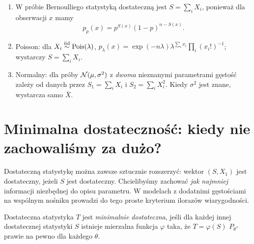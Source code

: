 \begin{przyklad}
\begin{enumerate}
\item W próbie Bernoulliego statystyką dostateczną jest
$S=\sum_iX_i$, ponieważ dla obserwacji $x$ mamy
\[
p_p(x)=p^{S(x)}(1-p)^{n-S(x)}.
\]
\item Poisson: dla $X_i\mathrel{\overset{\mathrm{iid}}\sim}\operatorname{Pois}(\lambda)$,
$p_\lambda(x)=\exp(-n\lambda)\lambda^{\sum_i x_i}
\prod_i(x_i!)^{-1}$; wystarczy $S=\sum_iX_i$.
\item Normalny: dla próby $\mathcal N(\mu,\sigma^2)$ z \emph{dwoma}
nieznanymi parametrami gęstość zależy od danych przez
$S_1=\sum_iX_i$ i $S_2=\sum_iX_i^2$.
Kiedy $\sigma^2$ jest znane, wystarcza samo $\bar X$.
\end{enumerate}
\end{przyklad}

\section{Minimalna dostateczność: kiedy nie zachowaliśmy za dużo?}
Dostateczną statystykę można zawsze sztucznie rozszerzyć:
wektor $(S,X_1)$ jest dostateczny, jeżeli $S$ jest dostateczny.
Chcielibyśmy zachować \emph{jak najmniej} informacji niezbędnej
do opisu parametru. W modelach z dodatnimi gęstościami na wspólnym
nośniku prowadzi do tego proste kryterium ilorazów wiarygodności.

\begin{definicja}
Dostateczna statystyka $T$ jest \emph{minimalnie dostateczna},
jeśli dla każdej innej dostatecznej statystyki $S$ istnieje mierzalna
funkcja $\varphi$ taka, że $T=\varphi(S)$ $P_\theta$-prawie na pewno
dla każdego $\theta$.
\end{definicja}

